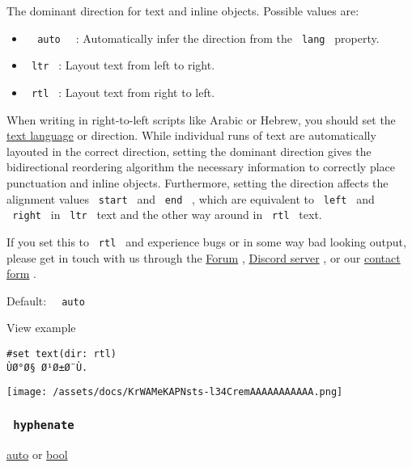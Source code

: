 The dominant direction for text and inline objects. Possible values are:

\begin{itemize}
\tightlist
\item
  \texttt{\ }{\texttt{\ auto\ }}\texttt{\ } : Automatically infer the
  direction from the \texttt{\ lang\ } property.
\item
  \texttt{\ ltr\ } : Layout text from left to right.
\item
  \texttt{\ rtl\ } : Layout text from right to left.
\end{itemize}

When writing in right-to-left scripts like Arabic or Hebrew, you should
set the \href{/docs/reference/text/text/\#parameters-lang}{text
language} or direction. While individual runs of text are automatically
layouted in the correct direction, setting the dominant direction gives
the bidirectional reordering algorithm the necessary information to
correctly place punctuation and inline objects. Furthermore, setting the
direction affects the alignment values \texttt{\ start\ } and
\texttt{\ end\ } , which are equivalent to \texttt{\ left\ } and
\texttt{\ right\ } in \texttt{\ ltr\ } text and the other way around in
\texttt{\ rtl\ } text.

If you set this to \texttt{\ rtl\ } and experience bugs or in some way
bad looking output, please get in touch with us through the
\href{https://forum.typst.app/}{Forum} ,
\href{https://discord.gg/2uDybryKPe}{Discord server} , or our
\href{https://typst.app/contact}{contact form} .

Default: \texttt{\ }{\texttt{\ auto\ }}\texttt{\ }


View example

\begin{verbatim}
#set text(dir: rtl)
ÙØ°Ø§ Ø¹Ø±Ø¨Ù.
\end{verbatim}

\texttt{[image: /assets/docs/KrWAMeKAPNsts-l34CremAAAAAAAAAAA.png]}

\subsubsection{\texorpdfstring{\texttt{\ hyphenate\ }}{ hyphenate }}\label{parameters-hyphenate}

\href{/docs/reference/foundations/auto/}{auto} {or}
\href{/docs/reference/foundations/bool/}{bool}

